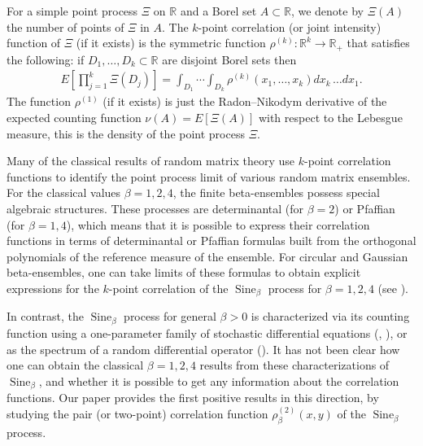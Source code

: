 \documentclass[12pt]{article}
\theoremstyle{definition} %
\newcommand{\R}{{\mathbb R}}
\theoremstyle{remark} %
\newcommand{\Sineb}{\operatorname{Sine}_{\beta}}
\begin{document}
For a simple point process $\Xi$ on $\R$ and a Borel set $A\subset \R$, we denote by $\Xi(A)$ the number of points of $\Xi$ in $A$. 
The $k$-point correlation (or joint intensity) function of $\Xi$ (if it exists) is the symmetric function $\rho^{(k)}:\R^k\to \R_+$ that satisfies the following: if  $D_1, \dots, D_k\subset \R$ are disjoint Borel sets then
\begin{align}
E[\prod_{j=1}^k \Xi(D_j)]=\int_{D_1} \cdots  \int_{D_k} {\rho^{(k)}(x_1,\dots,x_k)} dx_k\, \dots dx_1.
\end{align}
The function $\rho^{(1)}$ (if it exists) is just the Radon–Nikodym derivative of the expected counting function $\nu(A)=E[\Xi(A)]$ with respect to the Lebesgue measure, this is the density of the point process $\Xi$. 


Many of the classical results of random matrix theory use $k$-point correlation functions to identify the point process limit of various random matrix ensembles. For the classical values $\beta=1,2,4$, the finite beta-ensembles possess special algebraic structures. These processes are determinantal (for $\beta=2$) or Pfaffian (for $\beta=1, 4$), which means that it is possible to express their correlation functions in terms of determinantal or Pfaffian formulas built from the orthogonal polynomials of the reference measure of the ensemble. For circular and Gaussian beta-ensembles, one can take limits of these formulas to obtain explicit expressions for the $k$-point correlation of the $\Sineb$ process for $\beta=1,2,4$  (see \cite{AGZ, mehta, ForBook}). 




In contrast, the $\Sineb$ process           for general $\beta>0$ is  characterized via its counting function using a one-parameter family of stochastic differential equations (\cite{BVBV}, \cite{KS}), or as the spectrum of a random differential operator (\cite{BVBV_sbo}). It has not been clear how one can obtain the classical $\beta=1,2,4$ results from these characterizations of $\Sineb$, and whether it is possible to get any information about the correlation functions. Our paper provides the first positive results in this direction, by studying the pair (or two-point) correlation function $\rho^{(2)}_\beta(x,y)$ of the $\Sineb$ process. 
\end{document}
